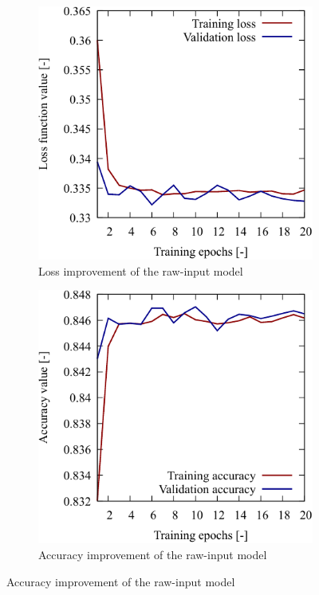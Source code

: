 \begin{figure}[H]
    \centering
    \begin{subfigure}[t]{0.45\linewidth}
        \includegraphics[width=\linewidth]{./Figure/4_Results/training/loss_raw.pdf}
        \caption{Loss improvement of the raw-input model}
        \label{fig:rawmodelS:loss}
    \end{subfigure}
    \hfill
    \begin{subfigure}[t]{0.45\linewidth}
        \includegraphics[width=\linewidth]{./Figure/4_Results/training/acc_raw.pdf}
        \caption{Accuracy improvement of the raw-input model}
        \label{fig:rawmodelS:acc}
    \end{subfigure}


\end{figure}
